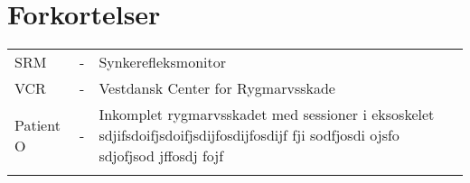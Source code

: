 \chapter{Forkortelser}

\begin{table}[H]
\center
{}
\begin{tabularx}{\linewidth}{l l X}	
SRM         & - &   Synkerefleksmonitor \\ \addlinespace[2mm]
VCR         & - &   Vestdansk Center for Rygmarvsskade \\ \addlinespace[2mm]
Patient O   & - &   Inkomplet rygmarvsskadet med sessioner i eksoskelet sdjifsdoifjsdoifjsdijfosdijfosdijf fji sodfjosdi ojsfo sdjofjsod jffosdj fojf \\ \addlinespace[2mm]

\end{tabularx}
\end{table}